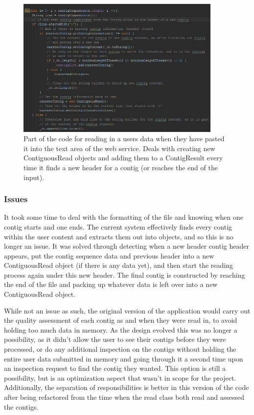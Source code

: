 \begin{figure}[H]
\centering
\includegraphics[width=0.9\textwidth]{images/readuserdata}
\caption{Part of the code for reading in a users data when they have pasted it into the text area of the web service. Deals with creating new ContiguousRead objects and adding them to a ContigResult every time it finds a new header for a contig (or reaches the end of the input).}
\end{figure}

\subsubsection{Issues}
It took some time to deal with the formatting of the file and knowing when one contig starts and one ends. The current system effectively finds every contig within the user content and extracts them out into objects, and so this is no longer an issue. It was solved through detecting when a new header contig header appears, put the contig sequence data and previous header into a new ContiguousRead object (if there is any data yet), and then start the reading process again under this new header. The final contig is constructed by reaching the end of the file and packing up whatever data is left over into a new ContiguousRead object.

While not an issue as such, the original version of the application would carry out the quality assessment of each contig as and when they were read in, to avoid holding too much data in memory. As the design evolved this was no longer a possibility, as it didn't allow the user to see their contigs before they were processed, or do any additional inspection on the contigs without holding the entire user data submitted in memory and going through it a second time upon an inspection request to find the contig they wanted. This option is still a possibility, but is an optimization aspect that wasn't in scope for the project. Additionally, the separation of responsibilities is better in this version of the code after being refactored from the time when the read class both read and assessed the contigs.

